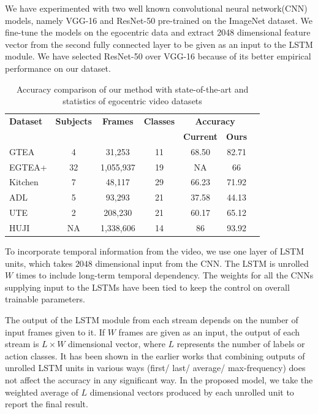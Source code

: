 \documentclass{article}
\begin{document}
We have experimented with two well known convolutional neural network(CNN) models, namely VGG-16 \cite{vgg2014} and ResNet-50 \cite{resnet50} pre-trained on the ImageNet dataset. We fine-tune the models on the egocentric data and extract 2048 dimensional feature vector from the second fully connected layer to be given as an input to the LSTM module. We have selected ResNet-50 over VGG-16 because of its better empirical performance on our dataset.

\renewcommand{\tabcolsep}{0.05cm}
\begin{table}[t]
\centering
\begin{tabular}{l c c c c c c}
\toprule[0.2mm]
\textbf{Dataset} & \textbf{Subjects} & \textbf{Frames} & \textbf{Classes} &  \multicolumn{2}{c}{\textbf{Accuracy}} \\
& & & & \textbf{Current} & \textbf{Ours}\\
\midrule
GTEA \cite{fathi2011learning} & 4 & 31,253 & 11 & 68.50\cite{suriya2016cvpr} & 82.71 \\
EGTEA+ \cite{fathi2011learning} & 32 & 1,055,937 & 19 & NA & 66 \\
Kitchen \cite{spriggs2009temporal} & 7 & 48,117 & 29 & 66.23\cite{suriya2016cvpr} & 71.92 \\
ADL \cite{pirsiavash2012detecting} & 5 & 93,293 & 21 & 37.58\cite{suriya2016cvpr} & 44.13 \\
UTE \cite{lee2012discovering} & 2 & 208,230 & 21 & 60.17\cite{suriya2016cvpr} & 65.12 \\
HUJI \cite{poleg2016compact} & NA & 1,338,606 & 14 & 86\cite{poleg2016compact} & 93.92 \\
\bottomrule[0.2mm]
\end{tabular}
\caption{Accuracy comparison of our method with state-of-the-art and statistics of egocentric video datasets}
\label{table:datasets}
\end{table}

To incorporate temporal information from the video, we use one layer of LSTM units, which takes $2048$ dimensional input from the CNN. The LSTM is unrolled $W$ times to include long-term temporal dependency. The weights for all the CNNs supplying input to the LSTMs have been tied to keep the control on overall trainable parameters.


The output of the LSTM module from each stream depends on the number of input frames given to it. If $W$ frames are given as an input, the output of each stream is $L \times W$ dimensional vector, where $L$ represents the number of labels or action classes. It has been shown in the earlier works that combining outputs of unrolled LSTM units in various ways (first/ last/ average/ max-frequency) does not affect the accuracy in any significant way. In the proposed model, we take the weighted average of $L$ dimensional vectors produced by each unrolled unit to report the final result.
\end{document}
